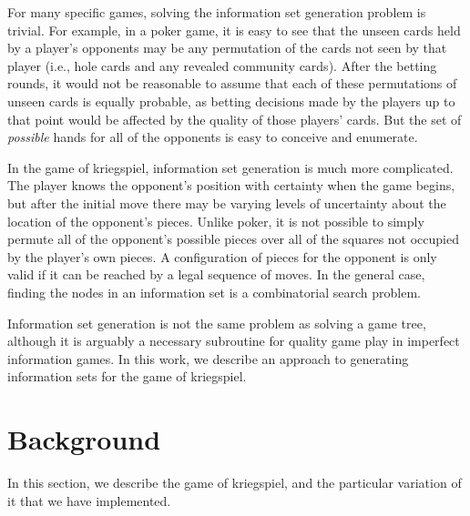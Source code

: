 \documentclass[conference]{IEEEtran}
\begin{document}
For many specific games, solving the information set generation problem is trivial.  For example, in a poker game, it is easy to
see that the unseen cards held by a player's opponents may be any permutation of the cards not seen by that player
(i.e., hole cards and any revealed community cards).  After the betting rounds, it would not be reasonable to assume
that each of these permutations of unseen cards is equally probable, as betting decisions made by the players up to that
point would be affected by the quality of those players' cards.  But the set of {\em possible} hands for all of the
opponents is easy to conceive and enumerate.

In the game of kriegspiel, information set generation is much more complicated.  The player knows the opponent's position with
certainty when the game begins, but after the initial move there may be varying levels of uncertainty about the location
of the opponent's pieces.  Unlike poker, it is not possible to simply permute all of the opponent's possible pieces over
all of the squares not occupied by the player's own pieces.  A configuration of pieces for the opponent is only valid if
it can be reached by a legal sequence of moves.  In the general case, finding the nodes in an information set is a
combinatorial search problem.

Information set generation is not the same problem as solving a game tree, although it is arguably a necessary
subroutine for quality game play in imperfect information games.  In this work, we describe an approach to generating
information sets for the game of kriegspiel. 

\section{Background}
In this section, we describe the game of kriegspiel, and the particular variation of it that we have implemented.
\end{document}
